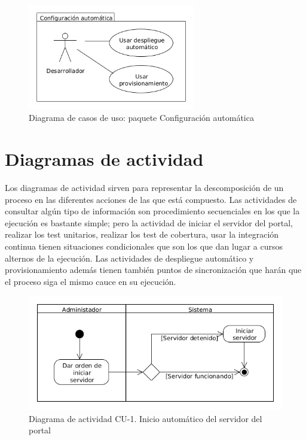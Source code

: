 \begin{figure}[!ht]
  \begin{center}
  \includegraphics[width=0.65\textwidth]{../images/diag_cu_ca.png}
  \caption{Diagrama de casos de uso: paquete Configuración automática}
  \label{fig:diag_cu_ca}
  \end{center}
\end{figure}

\newpage
\section{Diagramas de actividad}

Los diagramas de actividad sirven para representar la descomposición de un proceso en las diferentes acciones de las que está compuesto. Las actividades de consultar algún tipo de información son procedimiento secuenciales en los que la ejecución es bastante simple; pero la actividad de iniciar el servidor del portal, realizar los test unitarios, realizar los test de cobertura, usar la integración continua tienen situaciones condicionales que son los que dan lugar a cursos alternos de la ejecución. Las actividades de despliegue automático y provisionamiento además tienen también puntos de sincronización que harán que el proceso siga el mismo cauce en su ejecución.

\begin{figure}[!ht]
  \begin{center}
  \includegraphics[width=1\textwidth]{../images/diag_act_cu_01.png}
  \caption{Diagrama de actividad CU-1. Inicio automático del servidor del portal}
  \label{fig:diag_act_cu_01}
  \end{center}
\end{figure}

